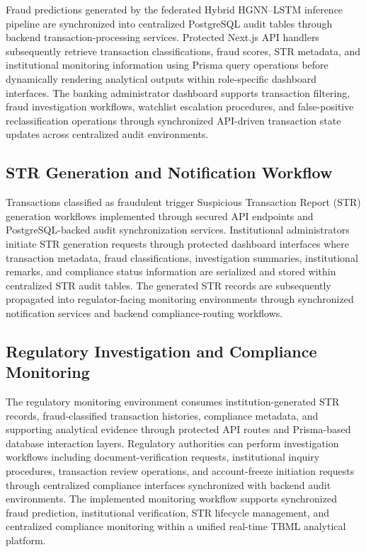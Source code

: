 Fraud predictions generated by the federated Hybrid HGNN--LSTM inference pipeline are synchronized into centralized PostgreSQL audit tables through backend transaction-processing services. Protected Next.js API handlers subsequently retrieve transaction classifications, fraud scores, STR metadata, and institutional monitoring information using Prisma query operations before dynamically rendering analytical outputs within role-specific dashboard interfaces. The banking administrator dashboard supports transaction filtering, fraud investigation workflows, watchlist escalation procedures, and false-positive reclassification operations through synchronized API-driven transaction state updates across centralized audit environments.

\subsection[STR Generation and Notification Workflow]{\textbf{STR Generation and Notification Workflow}}

Transactions classified as fraudulent trigger Suspicious Transaction Report (STR) generation workflows implemented through secured API endpoints and PostgreSQL-backed audit synchronization services. Institutional administrators initiate STR generation requests through protected dashboard interfaces where transaction metadata, fraud classifications, investigation summaries, institutional remarks, and compliance status information are serialized and stored within centralized STR audit tables. The generated STR records are subsequently propagated into regulator-facing monitoring environments through synchronized notification services and backend compliance-routing workflows.

\subsection[Regulatory Investigation and Compliance Monitoring]{\textbf{Regulatory Investigation and Compliance Monitoring}}

The regulatory monitoring environment consumes institution-generated STR records, fraud-classified transaction histories, compliance metadata, and supporting analytical evidence through protected API routes and Prisma-based database interaction layers. Regulatory authorities can perform investigation workflows including document-verification requests, institutional inquiry procedures, transaction review operations, and account-freeze initiation requests through centralized compliance interfaces synchronized with backend audit environments. The implemented monitoring workflow supports synchronized fraud prediction, institutional verification, STR lifecycle management, and centralized compliance monitoring within a unified real-time TBML analytical platform.


